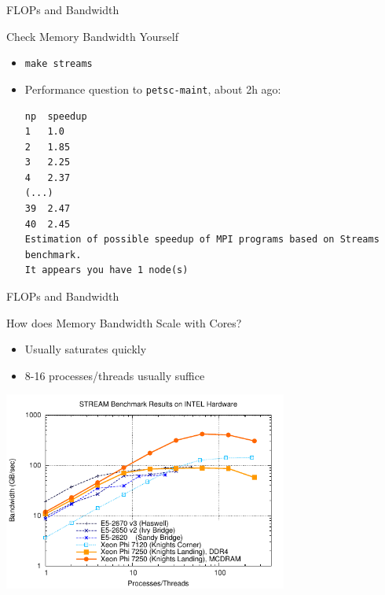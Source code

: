 \begin{frame}[fragile]{FLOPs and Bandwidth}

  \begin{block}{Check Memory Bandwidth Yourself}
  \begin{itemize}
   \item \lstinline|make streams|
   \item Performance question to \verb|petsc-maint|, about 2h ago:
   \begin{lstlisting}
np  speedup
1   1.0
2   1.85
3   2.25
4   2.37
(...)
39  2.47
40  2.45
Estimation of possible speedup of MPI programs based on Streams benchmark.
It appears you have 1 node(s)
    \end{lstlisting}
  \end{itemize}
 \end{block}

\end{frame}

\begin{frame}[fragile]{FLOPs and Bandwidth}

\begin{block}{How does Memory Bandwidth Scale with Cores?}
 \begin{itemize}
  \item Usually saturates quickly
  \item 8-16 processes/threads usually suffice
 \end{itemize}
\end{block}

\begin{center}
 \includegraphics[width=0.7\textwidth]{figures/stream}
\end{center}

\end{frame}



